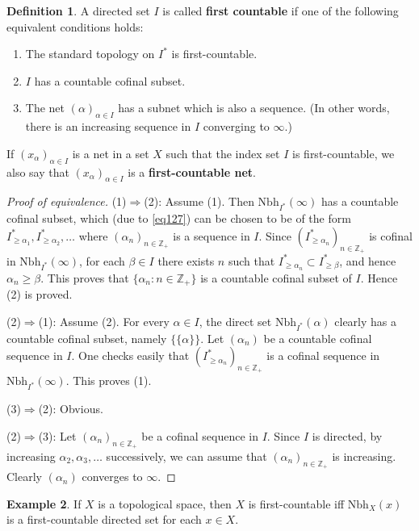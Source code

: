 \documentclass[12pt,b5paper,notitlepage]{article}
\theoremstyle{definition}
\newtheorem{df}{Definition}[subsection]
\newtheorem{eg}[df]{Example}
\theoremstyle{plain}
\newcommand{\Zbb}{\mathbb Z}
\newcommand{\Nbh}{\mathrm{Nbh}}
\numberwithin{equation}{section}
\begin{document}
\begin{df}
A directed set $I$ is called \textbf{first countable}  if one of the following equivalent conditions holds:
\begin{enumerate}[label=(\arabic*)]
\item The standard topology on $I^*$ is first-countable.
\item $I$ has a countable cofinal subset.
\item The net $(\alpha)_{\alpha\in I}$ has a subnet which is also a sequence. (In other words, there is an increasing sequence in $I$ converging to $\infty$.) 
\end{enumerate} 
If $(x_\alpha)_{\alpha\in I}$ is a net in a set $X$ such that the index set $I$ is first-countable, we also say that $(x_\alpha)_{\alpha\in I}$ is a \textbf{first-countable net}. 
\end{df}

\begin{proof}[Proof of equivalence]
(1)$\Rightarrow$(2): Assume (1). Then $\Nbh_{I^*}(\infty)$ has a countable cofinal subset, which (due to \eqref{eq127}) can be chosen to be of the form $I_{\geq\alpha_1}^*,I_{\geq\alpha_2}^*,\dots$ where $(\alpha_n)_{n\in\Zbb_+}$ is a sequence in $I$. Since $(I_{\geq\alpha_n}^*)_{n\in\Zbb_+}$ is cofinal in $\Nbh_{I^*}(\infty)$, for each $\beta\in I$ there exists $n$ such that $I_{\geq\alpha_n}^*\subset I_{\geq\beta}^*$, and hence $\alpha_n\geq\beta$. This proves that $\{\alpha_n:n\in\Zbb_+\}$ is a countable cofinal subset of $I$. Hence (2) is proved.

(2)$\Rightarrow$(1): Assume (2). For every $\alpha\in I$, the direct set $\Nbh_{I^*}(\alpha)$ clearly has a countable cofinal subset, namely $\{\{\alpha\}\}$. Let $(\alpha_n)$ be a countable cofinal sequence in $I$. One checks easily that $(I_{\geq\alpha_n}^*)_{n\in\Zbb_+}$ is a cofinal sequence in $\Nbh_{I^*}(\infty)$. This proves (1).

(3)$\Rightarrow$(2): Obvious.

(2)$\Rightarrow$(3): Let $(\alpha_n)_{n\in\Zbb_+}$ be a cofinal sequence in $I$. Since $I$ is directed, by increasing $\alpha_2,\alpha_3,\dots$ successively, we can assume that $(\alpha_n)_{n\in\Zbb_+}$ is increasing. Clearly $(\alpha_n)$ converges to $\infty$.
\end{proof}



\begin{eg}
If $X$ is a topological space, then $X$ is first-countable iff $\Nbh_X(x)$ is a first-countable directed set for each $x\in X$.
\end{eg}
\end{document}
